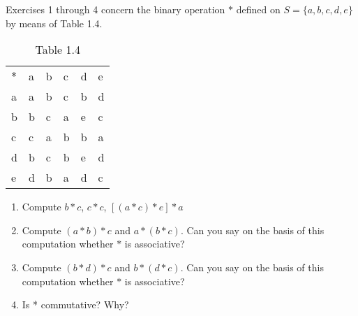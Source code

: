 \documentclass[10pt,letterpaper]{article}
\begin{document}
Exercises 1 through 4 concern the binary operation $ \ast $ defined on $S=\{a,b,c,d,e\}$ by means of Table 1.4.
  \begin{table}[h]
    \begin{center}
      \begin{tabular}{l!{\vrule width 2pt}l|l|l|l|l}
        $\ast$ & a & b & c & d & e \\
        a & a & b & c & b & d \\
        \hline
        b & b & c & a & e & c\\
        \hline
        c & c & a & b & b & a\\
        \hline
        d & b & c & b & e & d \\
        \hline
        e & d & b & a & d & c
      \end{tabular}
    \end{center}
    \captionsetup{labelformat=empty}
    \caption{Table 1.4}
  \end{table}
  \begin{enumerate}
    \item Compute $ b \ast c $, $ c \ast c $, $ [(a \ast c) \ast e] \ast a $
    \item Compute $ (a \ast b) \ast c $ and $a \ast (b \ast c)$. Can you say on the basis of this computation whether $\ast$ is associative?
    \item Compute $(b \ast d) \ast c$ and $b \ast (d \ast c)$. Can you say on the basis of this computation whether $\ast$ is associative?
    \item Is * commutative? Why?
  \end{enumerate}
  
\end{document}
